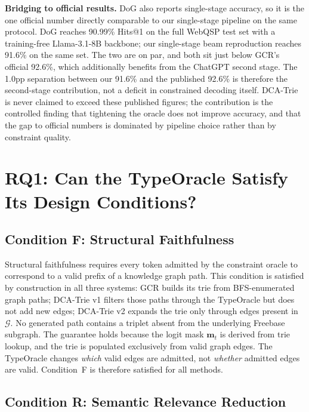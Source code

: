 \textbf{Bridging to official results.} DoG \citep{li2024-decoding-on-graphs} also reports single-stage accuracy, so it is the one official number directly comparable to our single-stage pipeline on the same protocol. DoG reaches 90.99\% Hits@1 on the full WebQSP test set with a training-free Llama-3.1-8B backbone; our single-stage beam reproduction reaches 91.6\% on the same set. The two are on par, and both sit just below GCR's official 92.6\%, which additionally benefits from the ChatGPT second stage. The 1.0pp separation between our 91.6\% and the published 92.6\% is therefore the second-stage contribution, not a deficit in constrained decoding itself. DCA-Trie is never claimed to exceed these published figures; the contribution is the controlled finding that tightening the oracle does not improve accuracy, and that the gap to official numbers is dominated by pipeline choice rather than by constraint quality.

\section{RQ1: Can the TypeOracle Satisfy Its Design Conditions?}
\label{sec:ch4conditions}

\subsection{Condition F: Structural Faithfulness}

Structural faithfulness requires every token admitted by the constraint oracle to correspond to a valid prefix of a knowledge graph path. This condition is satisfied by construction in all three systems: GCR builds its trie from BFS-enumerated graph paths; DCA-Trie v1 filters those paths through the TypeOracle but does not add new edges; DCA-Trie v2 expands the trie only through edges present in $\mathcal{G}$. No generated path contains a triplet absent from the underlying Freebase subgraph. The guarantee holds because the logit mask $\mathbf{m}_t$ is derived from trie lookup, and the trie is populated exclusively from valid graph edges. The TypeOracle changes \textit{which} valid edges are admitted, not \textit{whether} admitted edges are valid. Condition~F is therefore satisfied for all methods.

\subsection{Condition R: Semantic Relevance Reduction}

